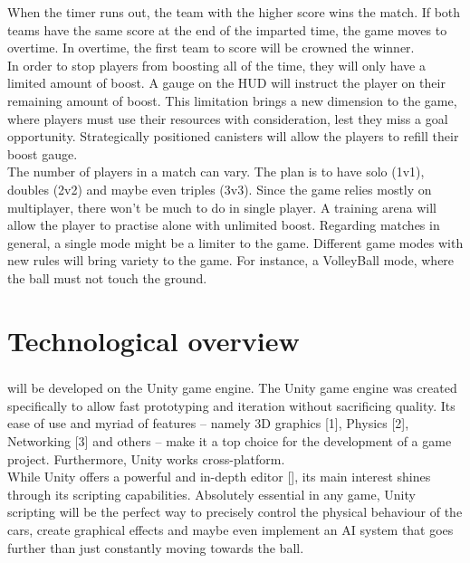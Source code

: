 When the timer runs out, the team with the higher score wins the match. If both teams have the same score at the end of the imparted time, the game moves to overtime. In overtime, the first team to score will be crowned the winner. \\

In order to stop players from boosting all of the time, they will only have a limited amount of boost. A gauge on the HUD will instruct the player on their remaining amount of boost. This limitation brings a new dimension to the game, where players must use their resources with consideration, lest they miss a goal opportunity. Strategically positioned canisters will allow the players to refill their boost gauge.\\

The number of players in a match can vary. The plan is to have solo (1v1), doubles (2v2) and maybe even triples (3v3). Since the game relies mostly on multiplayer, there won’t be much to do in single player. A training arena will allow the player to practise alone with unlimited boost. Regarding matches in general, a single mode might be a limiter to the game. Different game modes with new rules will bring variety to the game. For instance, a VolleyBall mode, where the ball must not touch the ground.\\

\chapter{Technological overview}

\paragraph{}\FR will be developed on the Unity game engine. The Unity game engine was created specifically to allow fast prototyping and iteration without sacrificing quality. Its ease of use and myriad of features – namely 3D graphics [1], Physics [2], Networking [3] and others – make it a top choice for the development of a game project. Furthermore, Unity works cross-platform.\\

While Unity offers a powerful and in-depth editor [], its main interest shines through its scripting capabilities. Absolutely essential in any game, Unity scripting will be the perfect way to precisely control the physical behaviour of the cars, create graphical effects and maybe even implement an AI system that goes further than just constantly moving towards the ball.\\

